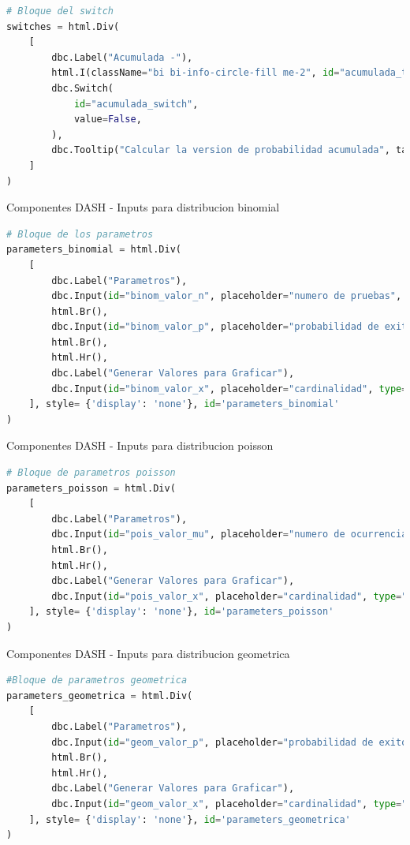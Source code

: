 \documentclass[
	12pt, %
]{fphw}
\begin{document}
\begin{lstlisting}[language=Python]
# Bloque del switch                                                                                        
switches = html.Div(
    [
        dbc.Label("Acumulada -"),
        html.I(className="bi bi-info-circle-fill me-2", id="acumulada_tooltip"),
        dbc.Switch(
            id="acumulada_switch",
            value=False,
        ),
        dbc.Tooltip("Calcular la version de probabilidad acumulada", target="acumulada_tooltip")
    ]
)
\end{lstlisting}

{\color{teal}
  \dotfill
  Componentes DASH - Inputs para distribucion binomial
  \dotfill}

\begin{lstlisting}[language=Python]
# Bloque de los parametros                                                                                 
parameters_binomial = html.Div(
    [
        dbc.Label("Parametros"),
        dbc.Input(id="binom_valor_n", placeholder="numero de pruebas", type="number"),
        html.Br(),
        dbc.Input(id="binom_valor_p", placeholder="probabilidad de exitos [0-1]", type="number"),
        html.Br(),
        html.Hr(),
        dbc.Label("Generar Valores para Graficar"),
        dbc.Input(id="binom_valor_x", placeholder="cardinalidad", type="number"),
    ], style= {'display': 'none'}, id='parameters_binomial'
)
\end{lstlisting}
\newpage
{\color{teal}
  \dotfill
  Componentes DASH - Inputs para distribucion poisson
  \dotfill}

\begin{lstlisting}[language=Python]
# Bloque de parametros poisson                                                                             
parameters_poisson = html.Div(
    [
        dbc.Label("Parametros"),
        dbc.Input(id="pois_valor_mu", placeholder="numero de ocurrencias esperadas > 0", type="number"),
        html.Br(),
        html.Hr(),
        dbc.Label("Generar Valores para Graficar"),
        dbc.Input(id="pois_valor_x", placeholder="cardinalidad", type="number")
    ], style= {'display': 'none'}, id='parameters_poisson'
)
\end{lstlisting}

{\color{teal}
  \dotfill
  Componentes DASH - Inputs para distribucion geometrica
  \dotfill}

\begin{lstlisting}[language=Python]
#Bloque de parametros geometrica                                                                          
parameters_geometrica = html.Div(
    [
        dbc.Label("Parametros"),
        dbc.Input(id="geom_valor_p", placeholder="probabilidad de exito [0-1]", type="number"),
        html.Br(),
        html.Hr(),
        dbc.Label("Generar Valores para Graficar"),
        dbc.Input(id="geom_valor_x", placeholder="cardinalidad", type="number")
    ], style= {'display': 'none'}, id='parameters_geometrica'
)
\end{lstlisting}
\end{document}
